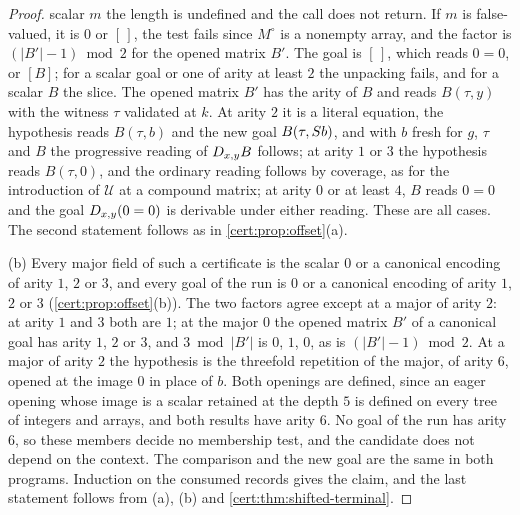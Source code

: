 \begin{proof}
scalar $m$ the length is undefined and the call does not return. If $m$ is
false-valued, it is $0$ or $[\,]$, the test fails since $M^{\circ}$ is a nonempty
array, and the factor is $(\lvert B'\rvert-1)\bmod 2$ for the opened matrix $B'$. The
goal is $[\,]$, which reads $0=0$, or $[B]$; for a scalar goal or one of arity at least
$2$ the unpacking fails, and for a scalar $B$ the slice. The opened matrix $B'$ has
the arity of $B$ and reads $B(\tau,y)$ with the witness $\tau$ validated at $k$. At
arity $2$ it is a literal equation, the hypothesis reads $B(\tau,b)$ and the new goal
$B(\tau,S b)$, and with $b$ fresh for $g$, $\tau$ and $B$ the progressive reading
of $D_{x,y}B$ follows; at arity $1$ or $3$ the hypothesis reads $B(\tau,0)$, and the
ordinary reading follows by coverage, as for the introduction of $\mathcal U$ at a
compound matrix; at arity $0$ or at least $4$, $B$ reads $0=0$ and the goal
$D_{x,y}(0=0)$ is derivable under either reading. These are all cases. The second
statement follows as in \cref{cert:prop:offset}(a).

(b) Every major field of such a certificate is the scalar $0$ or a canonical
encoding of arity $1$, $2$ or $3$, and every goal of the run is $0$ or a canonical
encoding of arity $1$, $2$ or $3$ (\cref{cert:prop:offset}(b)). The two factors agree
except at a major of arity $2$: at arity $1$ and $3$ both are $1$; at the major $0$
the opened matrix $B'$ of a canonical goal has arity $1$, $2$ or $3$, and
$3\bmod\lvert B'\rvert$ is $0$, $1$, $0$, as is $(\lvert B'\rvert-1)\bmod 2$. At a
major of arity $2$ the hypothesis is the threefold repetition of the major, of arity
$6$, opened at the image $0$ in place of $b$. Both openings are defined, since an
eager opening whose image is a scalar retained at the depth $5$ is defined on every
tree of integers and arrays, and both results have arity $6$. No goal of the run has
arity $6$, so these members decide no membership test, and the candidate does not
depend on the context. The comparison and the new goal are the same in both
programs. Induction on the consumed records gives the claim, and the last statement
follows from (a), (b) and \cref{cert:thm:shifted-terminal}.
\end{proof}

